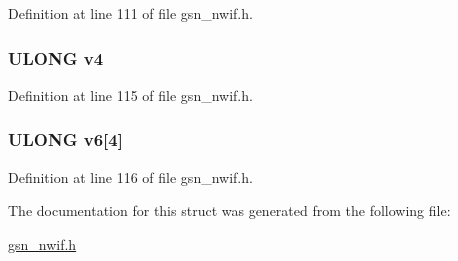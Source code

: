 Definition at line 111 of file gsn\_\-nwif.h.

\hypertarget{a00173_a552e9ee12ea257a07324e81aac527331}{
\subsubsection[{v4}]{\setlength{\rightskip}{0pt plus 5cm}ULONG {\bf v4}}}
\label{a00173_a552e9ee12ea257a07324e81aac527331}


Definition at line 115 of file gsn\_\-nwif.h.

\hypertarget{a00173_a2632f465d3137898db0fb6622dd51398}{
\subsubsection[{v6}]{\setlength{\rightskip}{0pt plus 5cm}ULONG {\bf v6}\mbox{[}4\mbox{]}}}
\label{a00173_a2632f465d3137898db0fb6622dd51398}


Definition at line 116 of file gsn\_\-nwif.h.



The documentation for this struct was generated from the following file:\begin{DoxyCompactItemize}
\item 
\hyperlink{a00534}{gsn\_\-nwif.h}\end{DoxyCompactItemize}
